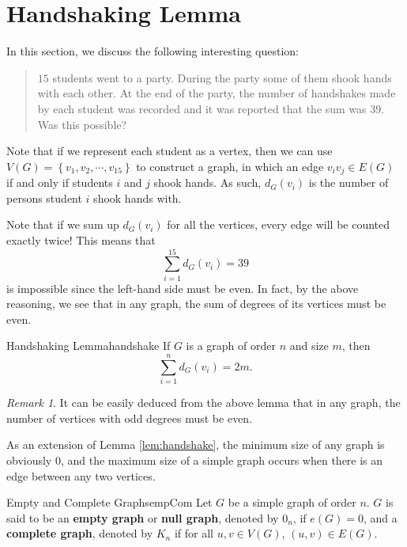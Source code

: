 \documentclass[math]{amznotes}
\theoremstyle{remark}
\newtheorem*{remark}{Remark}
\begin{document}
\section{Handshaking Lemma}
In this section, we discuss the following interesting question:
\begin{quote}
    $15$ students went to a party. During the party some of them shook hands with each other. At the end of the party, the number of handshakes made by each student was recorded and it was reported that the sum was $39$. Was this possible?
\end{quote}
Note that if we represent each student as a vertex, then we can use $V(G) = \left\{v_1, v_2, \cdots, v_{15}\right\}$ to construct a graph, in which an edge $v_iv_j \in E(G)$ if and only if students $i$ and $j$ shook hands. As such, $d_G(v_i)$ is the number of persons student $i$ shook hands with.

Note that if we sum up $d_G(v_i)$ for all the vertices, every edge will be counted exactly twice! This means that
\begin{equation*}
    \sum_{i = 1}^{15}d_G(v_i) = 39
\end{equation*}
is impossible since the left-hand side must be even. In fact, by the above reasoning, we see that in any graph, the sum of degrees of its vertices must be even.
\begin{lembox}{Handshaking Lemma}{handshake}
    If $G$ is a graph of order $n$ and size $m$, then
    \begin{equation*}
        \sum_{i = 1}^{n}d_G(v_i) = 2m.
    \end{equation*}
\end{lembox}
\begin{notebox}
    \begin{remark}
        It can be easily deduced from the above lemma that in any graph, the number of vertices with odd degrees must be even.
    \end{remark}
\end{notebox}
As an extension of Lemma \ref{lem:handshake}, the minimum size of any graph is obviously $0$, and the maximum size of a simple graph occurs when there is an edge between any two vertices.
\begin{dfnbox}{Empty and Complete Graphs}{empCom}
    Let $G$ be a simple graph of order $n$. $G$ is said to be an {\color{red} \textbf{empty graph}} or {\color{red} \textbf{null graph}}, denoted by $0_n$, if $e(G) = 0$, and a {\color{red} \textbf{complete graph}}, denoted by $K_n$ if for all $u, v \in V(G)$, $(u, v) \in E(G)$. 
\end{dfnbox}
\end{document}
